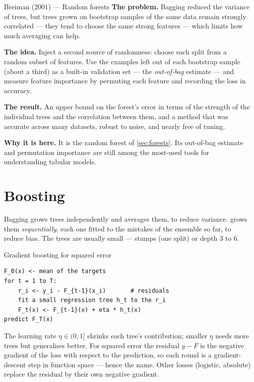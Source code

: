 \begin{researchspotlight}{Breiman (2001) --- Random forests}
\textbf{The problem.} Bagging reduced the variance of trees, but trees grown on
bootstrap samples of the same data remain strongly correlated --- they tend to
choose the same strong features --- which limits how much averaging can help.

\textbf{The idea.} Inject a second source of randomness: choose each split from a
random subset of features. Use the examples left out of each bootstrap sample
(about a third) as a built-in validation set --- the \emph{out-of-bag} estimate
--- and measure feature importance by permuting each feature and recording the
loss in accuracy.

\textbf{The result.} An upper bound on the forest's error in terms of the strength
of the individual trees and the correlation between them, and a method that was
accurate across many datasets, robust to noise, and nearly free of tuning.

\textbf{Why it is here.} It is the random forest of \cref{sec:forests}. Its
out-of-bag estimate and permutation importance are still among the most-used
tools for understanding tabular models.
\parencite{breiman2001}
\end{researchspotlight}

\section{Boosting}
\label{sec:boosting}

Bagging grows trees independently and averages them, to reduce variance.
 grows them \emph{sequentially}, each one fitted to the mistakes
of the ensemble so far, to reduce bias. The trees are usually small --- stumps
(one split) or depth $3$ to $6$.

\begin{algorithmbox}{Gradient boosting for squared error}
\begin{lstlisting}[style=pseudocode]
F_0(x) <- mean of the targets
for t = 1 to T:
    r_i <- y_i - F_{t-1}(x_i)       # residuals
    fit a small regression tree h_t to the r_i
    F_t(x) <- F_{t-1}(x) + eta * h_t(x)
predict F_T(x)
\end{lstlisting}
The learning rate $\eta \in (0,1]$ shrinks each tree's contribution; smaller
$\eta$ needs more trees but generalises better. For squared error the residual
$y - F$ is the negative gradient of the loss with respect to the prediction, so
each round is a gradient-descent step in function space --- hence the name. Other
losses (logistic, absolute) replace the residual by their own negative gradient.
\end{algorithmbox}

